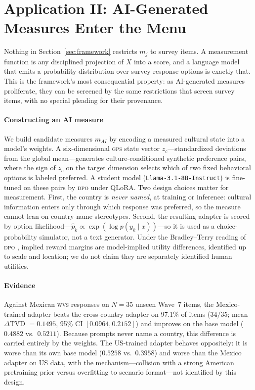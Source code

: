 \documentclass[11pt,letterpaper]{article}
\newcommand{\GPS}{\textsc{gps}}
\newcommand{\WVS}{\textsc{wvs}}
\newcommand{\DPO}{\textsc{dpo}}
\begin{document}
\section{Application II: AI-Generated Measures Enter the Menu}
\label{sec:ai}

Nothing in Section~\ref{sec:framework} restricts $m_j$ to survey items. A measurement function is any
disciplined projection of $X$ into a score, and a language model that emits a probability distribution over
survey response options is exactly that. This is the framework's most consequential property: as AI-generated
measures proliferate, they can be screened by the same restrictions that screen survey items, with no special
pleading for their provenance.

\paragraph{Constructing an AI measure} We build candidate measures $m_{AI}$ by encoding a measured cultural
state into a model's weights. A six-dimensional \GPS{} state vector $z_c$---standardized deviations from the
global mean---generates culture-conditioned synthetic preference pairs, where the sign of $z_c$ on the target
dimension selects which of two fixed behavioral options is labeled preferred. A student model
(\texttt{Llama-3.1-8B-Instruct}) is fine-tuned on these pairs by \DPO{} under QLoRA. Two design choices matter
for measurement. First, the country is \emph{never named}, at training or inference: cultural information
enters only through which response was preferred, so the measure cannot lean on country-name stereotypes.
Second, the resulting adapter is scored by option likelihood---$\hat p_k \propto \exp(\log p(y_k \mid
x))$---so it is used as a choice-probability simulator, not a text generator. Under the Bradley--Terry
reading of \DPO{} \cite{rafailov2023,bradley1952,mcfadden1974}, implied reward margins are model-implied
utility differences, identified up to scale and location; we do not claim they are separately identified
human utilities.

\paragraph{Evidence} Against Mexican \WVS{} responses on $N=35$ unseen Wave~7 items, the Mexico-trained
adapter beats the cross-country adapter on 97.1\% of items ($34/35$; mean $\Delta$TVD $=0.1495$, 95\% CI
$[0.0964, 0.2152]$) and improves on the base model ($0.4882$ vs.\ $0.5211$). Because prompts never name a
country, this difference is carried entirely by the weights. The US-trained adapter behaves oppositely: it is
worse than its own base model ($0.5258$ vs.\ $0.3958$) and worse than the Mexico adapter on US data, with the
mechanism---collision with a strong American pretraining prior versus overfitting to scenario format---not
identified by this design.
\end{document}
